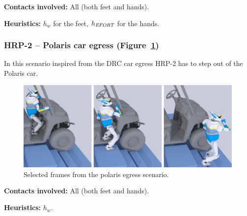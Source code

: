 \noindent\textbf{Contacts involved:} All (both feet and hands).

\noindent\textbf{Heuristics:} $h_w$ for the feet, $h_{\textrm{\it EFORT}}$  for the hands.



\subsubsection{HRP-2 -- Polaris car egress (Figure~\ref{fig:car})}
In this scenario inspired from the DRC car egress HRP-2 has to step out of the Polaris car.

\begin{figure}
  \centering
  \includegraphics[width=1\linewidth]{figures/polaris}
  \caption{
           Selected frames from the polaris egress scenario. }
		   \label{fig:car}
\end{figure}


\noindent\textbf{Contacts involved:} All (both feet and hands).

\noindent\textbf{Heuristics:} $h_w$.



